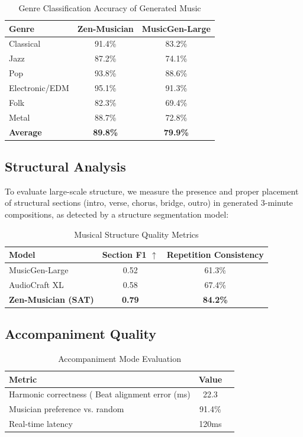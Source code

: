 \documentclass[11pt,a4paper]{article}
\begin{document}
\begin{table}[H]
\centering
\begin{tabular}{lcc}
\toprule
\textbf{Genre} & \textbf{Zen-Musician} & \textbf{MusicGen-Large} \\
\midrule
Classical & 91.4\% & 83.2\% \\
Jazz & 87.2\% & 74.1\% \\
Pop & 93.8\% & 88.6\% \\
Electronic/EDM & 95.1\% & 91.3\% \\
Folk & 82.3\% & 69.4\% \\
Metal & 88.7\% & 72.8\% \\
\textbf{Average} & \textbf{89.8\%} & \textbf{79.9\%} \\
\bottomrule
\end{tabular}
\caption{Genre Classification Accuracy of Generated Music}
\end{table}

\subsection{Structural Analysis}

To evaluate large-scale structure, we measure the presence and proper placement of structural
sections (intro, verse, chorus, bridge, outro) in generated 3-minute compositions, as
detected by a structure segmentation model:

\begin{table}[H]
\centering
\begin{tabular}{lcc}
\toprule
\textbf{Model} & \textbf{Section F1} $\uparrow$ & \textbf{Repetition Consistency} \\
\midrule
MusicGen-Large & 0.52 & 61.3\% \\
AudioCraft XL & 0.58 & 67.4\% \\
\textbf{Zen-Musician (SAT)} & \textbf{0.79} & \textbf{84.2\%} \\
\bottomrule
\end{tabular}
\caption{Musical Structure Quality Metrics}
\end{table}

\subsection{Accompaniment Quality}

\begin{table}[H]
\centering
\begin{tabular}{lcc}
\toprule
\textbf{Metric} & \textbf{Value} \\
\midrule
Harmonic correctness (%
Beat alignment error (ms) & 22.3 \\
Musician preference vs. random & 91.4\% \\
Real-time latency & 120ms \\
\bottomrule
\end{tabular}
\caption{Accompaniment Mode Evaluation}
\end{table}
\end{document}
